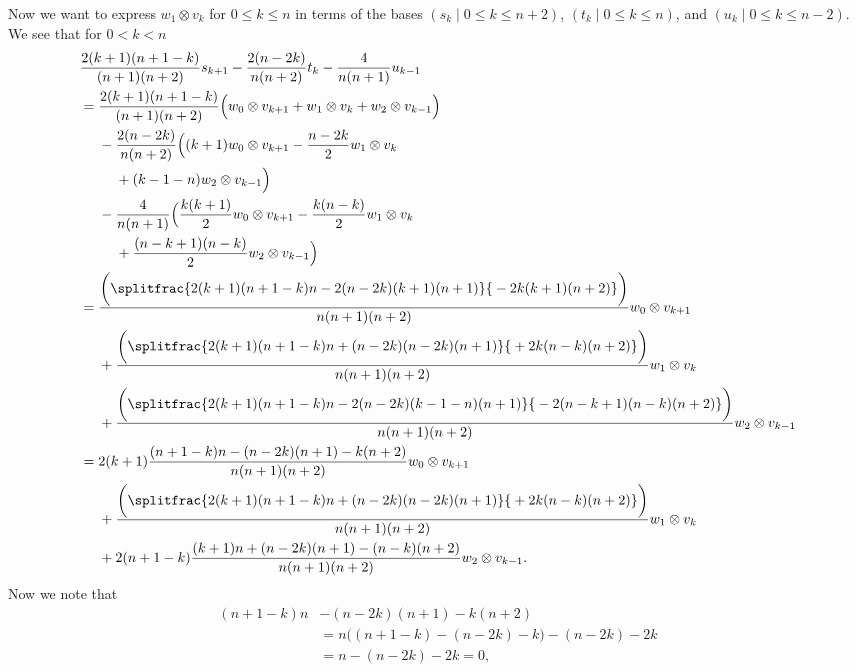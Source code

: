 Now we want to express $w_1\otimes v_k$ for $0\leq k\leq n$ in terms of the bases $(s_k \mid 0\leq k\leq n+2)$, $(t_k \mid 0\leq k\leq n)$, and $(u_k \mid 0\leq k\leq n-2)$. We see that for $0<k<n$
\begin{align*}
  &\dfrac{2(k+1)(n+1-k)}{(n+1)(n+2)}s_{k+1} - \dfrac{2(n-2k)}{n(n+2)}t_k - \dfrac{4}{n(n+1)}u_{k-1}\\
                                   &= \dfrac{2(k+1)(n+1-k)}{(n+1)(n+2)}\Bigl( w_0\otimes v_{k+1} + w_1\otimes v_{k} + w_2\otimes v_{k-1} \Bigr) \\*
                                   &\phantom{{}={}}{} - \dfrac{2(n-2k)}{n(n+2)}\Bigl( (k+1)w_0\otimes v_{k+1} - \dfrac{n-2k}{2}w_1\otimes v_k \\*
                                   &\phantom{{}={}-{}}{} + (k-1-n)w_2\otimes v_{k-1} \Bigr) \\*
                                   &\phantom{{}={}}{} - \dfrac{4}{n(n+1)}\Bigl( \dfrac{k(k+1)}{2}w_0\otimes v_{k+1} - \dfrac{k(n-k)}{2}w_1\otimes v_k \\*
                                   &\phantom{{}={}+{}}{}+ \dfrac{(n-k+1)(n-k)}{2}w_2\otimes v_{k-1} \Bigr) \\
  &= \dfrac{
    \biggl(\splitfrac{2(k+1)(n+1-k)n-2(n-2k)(k+1)(n+1)}{{}-2k(k+1)(n+2)}\biggr)
    }{n(n+1)(n+2)}w_0\otimes v_{k+1} \\*
  &\phantom{{}={}}{} + \dfrac{
    \biggl(\splitfrac{2(k+1)(n+1-k)n+(n-2k)(n-2k)(n+1)}{{}+2k(n-k)(n+2)}\biggr)
    }
    {n(n+1)(n+2)}w_1\otimes v_k \\*
  &\phantom{{}={}}{} + \dfrac{
    \biggl(\splitfrac{2(k+1)(n+1-k)n-2(n-2k)(k-1-n)(n+1)}{{}-2(n-k+1)(n-k)(n+2)}\biggr)
    }
    {n(n+1)(n+2)}w_2\otimes v_{k-1} \\
  &= 2(k+1)\dfrac{
    (n+1-k)n-(n-2k)(n+1)-k(n+2)
    }
    {n(n+1)(n+2)}w_0\otimes v_{k+1} \\*
  &\phantom{{}={}}{} + \dfrac{
    \biggl(\splitfrac{2(k+1)(n+1-k)n+(n-2k)(n-2k)(n+1)}{{}+2k(n-k)(n+2)}\biggr)
    }
    {n(n+1)(n+2)}w_1\otimes v_k \\*
  &\phantom{{}={}}{} + 2(n+1-k)\dfrac{
    (k+1)n + (n-2k)(n+1) - (n-k)(n+2)
    }
    {n(n+1)(n+2)}w_2\otimes v_{k-1}.
\end{align*}
Now we note that
\begin{align*}
  (n+1-k)n&-(n-2k)(n+1)-k(n+2) \\
          &= n\bigl( (n+1-k)-(n-2k)-k \bigr)-(n-2k)-2k \\
          &= n-(n-2k)-2k = 0,
\end{align*}
